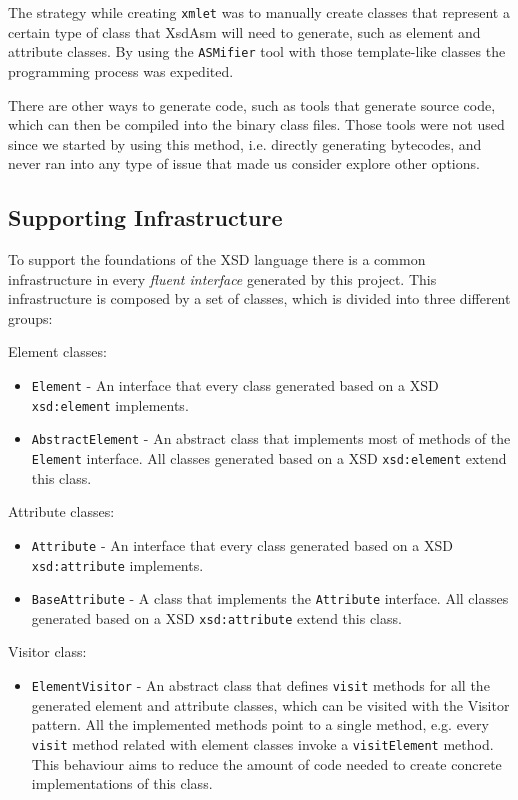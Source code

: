 \noindent
The strategy while creating \texttt{xmlet} was to manually create classes that represent a certain type of class that XsdAsm will need to generate, such as element and attribute classes. By using the \texttt{ASMifier} tool with those template-like classes the programming process was expedited. 

\noindent
There are other ways to generate code, such as tools that generate source code, which can then be compiled into the binary class files. Those tools were not used since we started by using this method, i.e. directly generating bytecodes, and never ran into any type of issue that made us consider explore other options.

\subsection{Supporting Infrastructure}
\label{sec:supportinginfrastructure}

To support the foundations of the \ac{XSD} language there is a common infrastructure in every \textit{fluent interface} generated by this project. This infrastructure is composed by a set of classes, which is divided into three different groups:

Element classes:

\begin{itemize}  
	\item \texttt{Element} - An interface that every class generated based on a \ac{XSD} \texttt{xsd:element} implements.
	\item \texttt{AbstractElement} - An abstract class that implements most of methods of the \texttt{Element} interface. All classes generated based on a \ac{XSD} \texttt{xsd:element} extend this class.
\end{itemize}

Attribute classes:

\begin{itemize}  
	\item \texttt{Attribute} - An interface that every class generated based on a \ac{XSD} \texttt{xsd:attribute} implements.
	\item \texttt{BaseAttribute} - A class that implements the \texttt{Attribute} interface. All classes generated based on a \ac{XSD} \texttt{xsd:attribute} extend this class.
\end{itemize}

Visitor class:

\begin{itemize}
	\item \texttt{ElementVisitor} - An abstract class that defines \texttt{visit} methods for all the generated element and attribute classes, which can be visited with the Visitor pattern. All the implemented methods point to a single method, e.g. every \texttt{visit} method related with element classes invoke a \texttt{visitElement} method. This behaviour aims to reduce the amount of code needed to create concrete implementations of this class.
\end{itemize}

